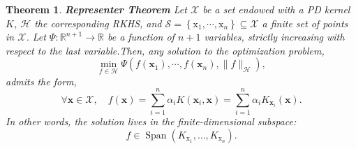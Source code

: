 \documentclass[12pt]{article}
\newtheorem{thm}{Theorem}
\begin{document}
\begin{thm}{\textbf{Representer Theorem}} \label{thm:representer}
Let $\mathcal X$ be a set endowed with a PD kernel $K$, $\mathcal H$ the corresponding RKHS, and $\mathcal{S}=\left\{\mathrm{x}_{1}, \cdots, \mathrm{x}_{n}\right\} \subseteq \mathcal{X}$ a finite set of points in $\mathcal X$. Let $\Psi: \mathbb{R}^{n+1} \rightarrow \mathbb{R}$ be a function of $n+1$ variables, strictly increasing with respect to the last variable.Then, any solution to the optimization problem,
\begin{equation}
\min _{f \in \mathcal{H}} \Psi\left(f\left(\mathbf{x}_{1}\right), \cdots, f\left(\mathbf{x}_{n}\right),\|f\|_{\mathcal{H}}\right),
\end{equation}
admits the form,
\begin{equation}
\forall \mathbf{x} \in \mathcal{X}, \quad f(\mathbf{x})=\sum_{i=1}^{n} \alpha_{i} K\left(\mathbf{x}_{i}, \mathbf{x}\right)=\sum_{i=1}^{n} \alpha_{i} K_{\mathbf{x}_{i}}(\mathbf{x}).
\end{equation}
In other words, the solution lives in the finite-dimensional subspace:
\begin{equation}
f \in \operatorname{Span}\left(K_{\mathrm{x}_{1}}, \ldots, K_{\mathrm{x}_{n}}\right).
\end{equation}
\end{thm}
\newpage
\end{document}
